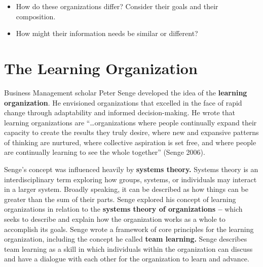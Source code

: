 \documentclass[
  letterpaper,
  DIV=11,
  numbers=noendperiod]{scrreprt}
\begin{document}
\begin{tcolorbox}[enhanced jigsaw, arc=.35mm, bottomrule=.15mm, bottomtitle=1mm, breakable, colback=white, colbacktitle=quarto-callout-tip-color!10!white, colframe=quarto-callout-tip-color-frame, coltitle=black, left=2mm, leftrule=.75mm, opacityback=0, opacitybacktitle=0.6, rightrule=.15mm, title=\textcolor{quarto-callout-tip-color}{\faLightbulb}\hspace{0.5em}{Pause and reflect}, titlerule=0mm, toprule=.15mm, toptitle=1mm]

\begin{itemize}
\item
  How do these organizations differ? Consider their goals and their
  composition.
\item
  How might their information needs be similar or different?
\end{itemize}

\end{tcolorbox}

\section{The Learning Organization}\label{the-learning-organization}

Business Management scholar Peter Senge developed the idea of the
\textbf{learning organization}. He envisioned organizations that
excelled in the face of rapid change through adaptability and informed
decision-making. He wrote that learning organizations are
``\ldots organizations where people continually expand their capacity to
create the results they truly desire, where new and expansive patterns
of thinking are nurtured, where collective aspiration is set free, and
where people are continually learning to see the whole together'' (Senge
2006).

Senge's concept was influenced heavily by \textbf{systems theory.}
Systems theory is an interdisciplinary term exploring how groups,
systems, or individuals may interact in a larger system. Broadly
speaking, it can be described as how things can be greater than the sum
of their parts. Senge explored his concept of learning organizations in
relation to the \textbf{systems theory of organizations --} which seeks
to describe and explain how the organization works as a whole to
accomplish its goals. Senge wrote a framework of core principles for the
learning organization, including the concept he called \textbf{team
learning.} Senge describes team learning as a skill in which individuals
within the organization can discuss and have a dialogue with each other
for the organization to learn and advance.
\end{document}
